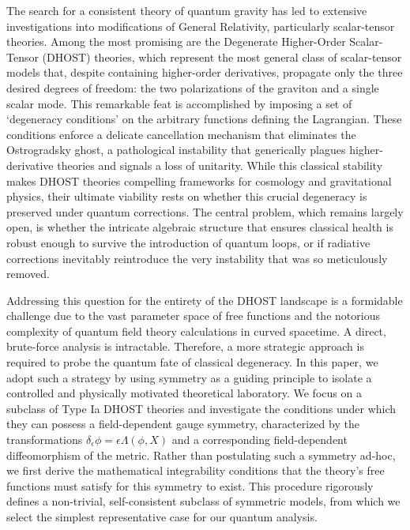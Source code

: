 \documentclass[twocolumn]{aastex631}
\begin{document}
The search for a consistent theory of quantum gravity has led to extensive investigations into modifications of General Relativity, particularly scalar-tensor theories. Among the most promising are the Degenerate Higher-Order Scalar-Tensor (DHOST) theories, which represent the most general class of scalar-tensor models that, despite containing higher-order derivatives, propagate only the three desired degrees of freedom: the two polarizations of the graviton and a single scalar mode. This remarkable feat is accomplished by imposing a set of `degeneracy conditions' on the arbitrary functions defining the Lagrangian. These conditions enforce a delicate cancellation mechanism that eliminates the Ostrogradsky ghost, a pathological instability that generically plagues higher-derivative theories and signals a loss of unitarity. While this classical stability makes DHOST theories compelling frameworks for cosmology and gravitational physics, their ultimate viability rests on whether this crucial degeneracy is preserved under quantum corrections. The central problem, which remains largely open, is whether the intricate algebraic structure that ensures classical health is robust enough to survive the introduction of quantum loops, or if radiative corrections inevitably reintroduce the very instability that was so meticulously removed.

Addressing this question for the entirety of the DHOST landscape is a formidable challenge due to the vast parameter space of free functions and the notorious complexity of quantum field theory calculations in curved spacetime. A direct, brute-force analysis is intractable. Therefore, a more strategic approach is required to probe the quantum fate of classical degeneracy. In this paper, we adopt such a strategy by using symmetry as a guiding principle to isolate a controlled and physically motivated theoretical laboratory. We focus on a subclass of Type Ia DHOST theories and investigate the conditions under which they can possess a field-dependent gauge symmetry, characterized by the transformations $\delta_\epsilon \phi = \epsilon \Lambda(\phi, X)$ and a corresponding field-dependent diffeomorphism of the metric. Rather than postulating such a symmetry ad-hoc, we first derive the mathematical integrability conditions that the theory's free functions must satisfy for this symmetry to exist. This procedure rigorously defines a non-trivial, self-consistent subclass of symmetric models, from which we select the simplest representative case for our quantum analysis.
\end{document}
